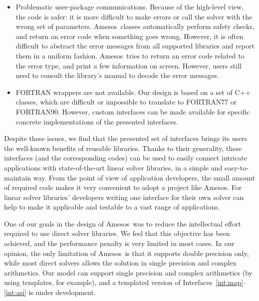 \documentclass[acmtoms,acmnow]{acmtrans2m}
\newcommand{\amesos}{{\sc Amesos}}
\begin{document}
\begin{itemize}
\item
Problematic user-package communications. Because of the high-level view, the
code is safer: it is more difficult to make errors or call the solver with the
wrong set of parameters. \amesos\ classes automatically perform safety checks,
and return an error code when something goes wrong. However, it is often
difficult to abstract the error messages from all supported libraries and
report them in a uniform fashion.  \amesos\ tries to return an error code
related to the error type, and print a few information on screen. However,
users still need to consult the library's manual to decode the error messages.

\item FORTRAN wrappers are not available. Our design is based on a set of C++
classes, which are difficult or impossible to translate to FORTRAN77 or
FORTRAN90. However, custom interfaces can be made available for specific
concrete implementations of the presented interfaces.
\end{itemize}

%

Despite these issues, we find that the presented set of interfaces
brings its users the well-known benefits of reusable libraries.
Thanks to their generality, these interfaces (and the corresponding
codes) can be used to easily connect intricate applications with
state-of-the-art linear solver libraries, in a simple and
easy-to-maintain way. From the point of view of application
developers, the small amount of required code makes it very
convenient to adopt a project like \amesos. For linear solver
libraries' developers  writing one interface for their own solver
can help to make it applicable and testable to a vast range of
applications.

One of our goals in the design of \amesos\ was to reduce the intellectual
effort required to use direct solver libraries. We feel that this objective
has been achieved, and the performance penalty is very limited in most cases.
In our opinion, the only limitation of \amesos\ is that it supports double
precision only, while most direct solvers allows the solution in single
precision and complex arithmetics.  Our model can support single precision and
complex arithmetics (by using templates, for example), and a templated
version of Interfaces~\ref{int:map}--\ref{int:asi} is under
development.
\end{document}
